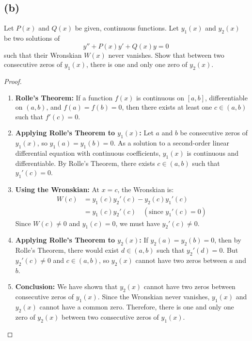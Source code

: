 \documentclass{article}
\begin{document}
\subsection*{(b)}
Let $P(x)$ and $Q(x)$ be given, continuous functions. Let $y_1(x)$ and $y_2(x)$ be two solutions of 
\[y'' + P(x)y' + Q(x)y = 0\]
such that their Wronskian $W(x)$ never vanishes. Show that between two consecutive zeros of $y_1(x)$, there is one and only one zero of $y_2(x)$.
\begin{proof}
~\begin{enumerate}
\item \textbf{Rolle's Theorem:}
If a function $f(x)$ is continuous on $[a, b]$, differentiable on $(a, b)$, and $f(a) = f(b) = 0$, then there exists at least one $c \in (a, b)$ such that $f'(c) = 0$.
\item \textbf{Applying Rolle's Theorem to $y_1(x)$:}
Let $a$ and $b$ be consecutive zeros of $y_1(x)$, so $y_1(a) = y_1(b) = 0$.  As a solution to a second-order linear differential equation with continuous coefficients, $y_1(x)$ is continuous and differentiable. By Rolle's Theorem, there exists $c \in (a, b)$ such that $y_1'(c) = 0$.
\item \textbf{Using the Wronskian:}
At $x = c$, the Wronskian is:
\begin{align*}
W(c) &= y_1(c)y_2'(c) - y_2(c)y_1'(c) \\
&= y_1(c)y_2'(c) \quad (\text{since } y_1'(c) = 0)
\end{align*}
Since $W(c) \neq 0$ and $y_1(c) = 0$, we must have $y_2'(c) \neq 0$.
\item \textbf{Applying Rolle's Theorem to $y_2(x)$:}
If $y_2(a) = y_2(b) = 0$, then by Rolle's Theorem, there would exist $d \in (a, b)$ such that $y_2'(d) = 0$. But $y_2'(c) \neq 0$ and $c \in (a, b)$, so $y_2(x)$ cannot have two zeros between $a$ and $b$.
\item \textbf{Conclusion:}
We have shown that $y_2(x)$ cannot have two zeros between consecutive zeros of $y_1(x)$. Since the Wronskian never vanishes, $y_1(x)$ and $y_2(x)$ cannot have a common zero.  Therefore, there is one and only one zero of $y_2(x)$ between two consecutive zeros of $y_1(x)$.
\end{enumerate}
\end{proof}
\end{document}
